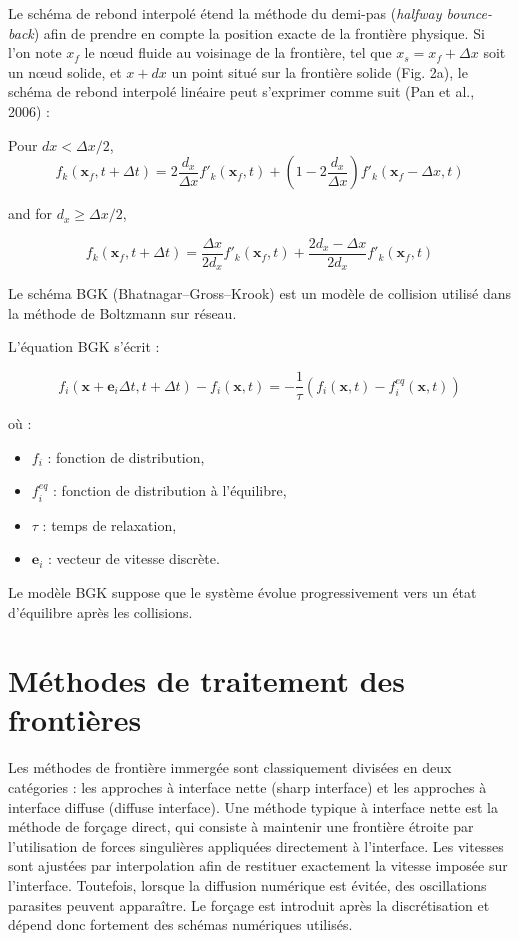 \documentclass[12pt,a4paper]{report}
\begin{document}
Le schéma de rebond interpolé étend la méthode du demi-pas (\textit{halfway bounce-back}) afin de prendre en compte la position exacte de la frontière physique. 
Si l’on note \( x_f \) le nœud fluide au voisinage de la frontière, tel que \( x_s = x_f + \Delta x \) soit un nœud solide, et \( x + dx \) un point situé sur la frontière solide (Fig. 2a), le schéma de rebond interpolé linéaire peut s’exprimer comme suit (Pan et al., 2006) :

Pour \( dx < \Delta x / 2 \),
\begin{equation}
f_k \left( \mathbf{x}_f, t + \Delta t \right) = 2 \frac{d_x}{\Delta x} f'_k \left( \mathbf{x}_f, t \right) + \left( 1 - 2 \frac{d_x}{\Delta x} \right) f'_k \left( \mathbf{x}_f - \Delta x, t \right)
\label{eq:interp1}
\end{equation}

and for \( d_x \geq \Delta x / 2 \),

\begin{equation}
f_k \left( \mathbf{x}_f, t + \Delta t \right) = \frac{\Delta x}{2d_x} f'_k \left( \mathbf{x}_f, t \right) + \frac{2d_x - \Delta x}{2d_x} f'_k \left( \mathbf{x}_f, t \right)
\label{eq:interp2}
\end{equation}

Le schéma BGK (Bhatnagar--Gross--Krook) est un modèle de collision utilisé dans la méthode de Boltzmann sur réseau.

L’équation BGK s’écrit :

\[
f_i(\mathbf{x}+\mathbf{e}_i \Delta t,t+\Delta t)-f_i(\mathbf{x},t)
=
-\frac{1}{\tau}
\left(
f_i(\mathbf{x},t)-f_i^{eq}(\mathbf{x},t)
\right)
\]

où :

\begin{itemize}
    \item $f_i$ : fonction de distribution,
    \item $f_i^{eq}$ : fonction de distribution à l’équilibre,
    \item $\tau$ : temps de relaxation,
    \item $\mathbf{e}_i$ : vecteur de vitesse discrète.
\end{itemize}

Le modèle BGK suppose que le système évolue progressivement vers un état d’équilibre après les collisions.
\section{Méthodes de traitement des frontières}
Les méthodes de frontière immergée sont classiquement divisées en deux catégories : les approches à interface nette (sharp interface) et les approches à interface diffuse (diffuse interface). Une méthode typique à interface nette est la méthode de forçage direct, qui consiste à maintenir une frontière étroite par l’utilisation de forces singulières appliquées directement à l’interface. Les vitesses sont ajustées par interpolation afin de restituer exactement la vitesse imposée sur l’interface. Toutefois, lorsque la diffusion numérique est évitée, des oscillations parasites peuvent apparaître. Le forçage est introduit après la discrétisation et dépend donc fortement des schémas numériques utilisés.
\end{document}
